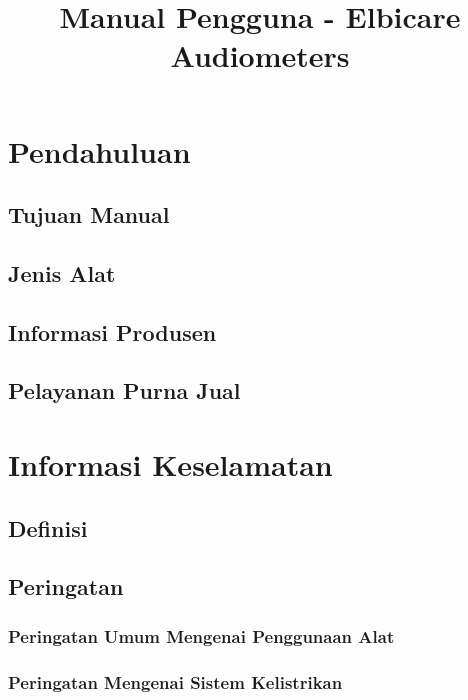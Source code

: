 \documentclass[11pt,a4paper,twoside,draft,onecolumn]{book}
\title{Manual Pengguna - Elbicare Audiometers}
\begin{document}
	\maketitle
	\renewcommand\contentsname{Daftar Isi}
	\tableofcontents
	
	\renewcommand\listfigurename{Daftar Gambar}
	\listoffigures
	
	\renewcommand\listtablename{Daftar Tabel}
	\listoftables
	\newpage
	
	\renewcommand\chaptername{Bab}
	
	\chapter{Pendahuluan}
		\section{Tujuan Manual}
		\section{Jenis Alat}
		\section{Informasi Produsen}
		\section{Pelayanan Purna Jual}
	\newpage
	
	\chapter{Informasi Keselamatan}
		\section{Definisi}
		\section{Peringatan}
			\subsection{Peringatan Umum Mengenai Penggunaan Alat}
			\subsection{Peringatan Mengenai Sistem Kelistrikan}
\end{document}
